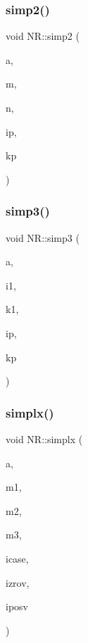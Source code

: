 \mbox{\label{namespaceNR_a7f8a4de14a8e48d4a3dd9a913b593f94}} 
\subsubsection{\texorpdfstring{simp2()}{simp2()}}
{\footnotesize\ttfamily void N\+R\+::simp2 (\begin{DoxyParamCaption}\item[{\mbox{\hyperlink{namespaceNR_a2b8abfda8fffad6ba0a1b5a4c0773dbf}{Mat\+\_\+\+I\+\_\+\+DP}} \&}]{a,  }\item[{const int}]{m,  }\item[{const int}]{n,  }\item[{int \&}]{ip,  }\item[{const int}]{kp }\end{DoxyParamCaption})}

\mbox{\label{namespaceNR_a534aa06bc7a2ffc101eb3606158d7292}} 
\subsubsection{\texorpdfstring{simp3()}{simp3()}}
{\footnotesize\ttfamily void N\+R\+::simp3 (\begin{DoxyParamCaption}\item[{\mbox{\hyperlink{namespaceNR_ad1513aa4697878ed3bff0b8b3c9dd910}{Mat\+\_\+\+I\+O\+\_\+\+DP}} \&}]{a,  }\item[{const int}]{i1,  }\item[{const int}]{k1,  }\item[{const int}]{ip,  }\item[{const int}]{kp }\end{DoxyParamCaption})}

\mbox{\label{namespaceNR_aef5e28f4e523bd00d12f051bbaa68c26}} 
\subsubsection{\texorpdfstring{simplx()}{simplx()}}
{\footnotesize\ttfamily void N\+R\+::simplx (\begin{DoxyParamCaption}\item[{\mbox{\hyperlink{namespaceNR_ad1513aa4697878ed3bff0b8b3c9dd910}{Mat\+\_\+\+I\+O\+\_\+\+DP}} \&}]{a,  }\item[{const int}]{m1,  }\item[{const int}]{m2,  }\item[{const int}]{m3,  }\item[{int \&}]{icase,  }\item[{\mbox{\hyperlink{namespaceNR_ade2338f6d53b7da3dd6d1c04804541f2}{Vec\+\_\+\+O\+\_\+\+I\+NT}} \&}]{izrov,  }\item[{\mbox{\hyperlink{namespaceNR_ade2338f6d53b7da3dd6d1c04804541f2}{Vec\+\_\+\+O\+\_\+\+I\+NT}} \&}]{iposv }\end{DoxyParamCaption})}

